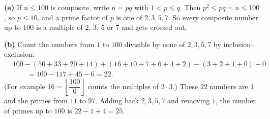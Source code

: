 \textbf{(a)} If $n\le100$ is composite, write $n=pq$ with $1<p\le q$. Then $p^2\le pq=n\le100$, so $p\le10$, and a prime factor of $p$ is one of $2,3,5,7$. So every composite number up to $100$ is a multiple of $2$, $3$, $5$ or $7$ and gets crossed out.

\textbf{(b)} Count the numbers from $1$ to $100$ divisible by none of $2,3,5,7$ by inclusion--exclusion:
\begin{align*}
&100-\left(50+33+20+14\right)+\left(16+10+7+6+4+2\right)-\left(3+2+1+0\right)+0\\
&\qquad=100-117+45-6=22.
\end{align*}
(For example $16=\left\lfloor\dfrac{100}6\right\rfloor$ counts the multiples of $2\cdot3$.) These $22$ numbers are $1$ and the primes from $11$ to $97$. Adding back $2,3,5,7$ and removing $1$, the number of primes up to $100$ is $22-1+4=\boxed{25}$.

